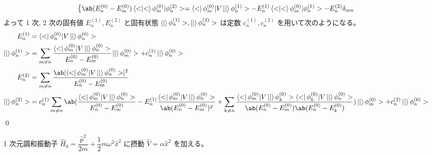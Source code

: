\documentclass[uplatex,dvipdfmx,a4paper,11pt]{jlreq}
\makeatletter
\numberwithin{equation}{section}
\theoremstyle{definition}
\renewenvironment{proof}[1][\proofname]{\par
  \normalfont
  \topsep6\p@\@plus6\p@ \trivlist
  \item[\hskip\labelsep{\bfseries #1}\@addpunct{\bfseries}]\ignorespaces\quad\par
}{%
  \qed\endtrivlist\@endpefalse
}
\renewcommand\proofname{証明}
\makeatother
\begin{document}
\begin{proof}
\begin{align}
\begin{dcases}
             \ab(E_n^{(0)} - E_m^{(0)})\braket<\phi_m^{(0)}|\phi_n^{(2)}> = \bra<\phi_m^{(0)}|V\ket|\phi_n^{(1)}> - E_n^{(1)}\braket<\phi_m^{(0)}|\phi_n^{(1)}> - E_n^{(2)}\delta_{mn}
           \end{dcases}
  \end{align}
  よって 1 次, 2 次の固有値 $E_n^{(1)}, E_n^{(2)}$ と固有状態 $\ket|\phi_n^{(1)}>, \ket|\phi_n^{(2)}>$ は定数 $c_n^{(1)}, c_n^{(2)}$ を用いて次のようになる。
  \begin{align}
    E_n^{(1)}          & = \bra<\phi_n^{(0)}|V\ket|\phi_n^{(0)}>                                                                                                                                                                                                                                                                                                                                                         \\
    \ket|\phi_n^{(1)}> & = \sum_{m\neq n}\frac{\bra<\phi_m^{(0)}|V\ket|\phi_n^{(0)}>}{E_n^{(0)} - E_m^{(0)}}\ket|\phi_m^{(0)}> + c_n^{(1)}\ket|\phi_n^{(0)}>                                                                                                                                                                                                                                                             \\
    E_n^{(2)}          & = \sum_{m\neq n}\frac{\ab|{\bra<\phi_m^{(0)}|V\ket|\phi_n^{(0)}>}|^2}{E_n^{(0)} - E_m^{(0)}}                                                                                                                                                                                                                                                                                                    \\
    \ket|\phi_n^{(2)}> & = c_n^{(1)}\sum_{m\neq n}\ab(\frac{\bra<\phi_m^{(0)}|V\ket|\phi_n^{(0)}>}{E_n^{(0)} - E_m^{(0)}} - E_n^{(1)}\frac{\bra<\phi_m^{(0)}|V\ket|\phi_n^{(0)}>}{\ab(E_n^{(0)} - E_m^{(0)})^2} + \sum_{k\neq n}\frac{\bra<\phi_m^{(0)}|V\ket|\phi_k^{(0)}>\bra<\phi_k^{(0)}|V\ket|\phi_n^{(0)}>}{\ab(E_n^{(0)} - E_m^{(0)})\ab(E_n^{(0)} - E_k^{(0)})})\ket|\phi_m^{(0)}> + c_n^{(2)}\ket|\phi_n^{(0)}>
  \end{align}
\end{proof}

\begin{proposition}
  1 次元調和振動子 $\hat{H}_0 = \dfrac{\hat{p}^2}{2m} + \dfrac{1}{2}m\omega^2\hat{x}^2$ に摂動 $\hat{V} = \alpha\hat{x}^2$ を加える。
\end{proposition}
\end{document}
